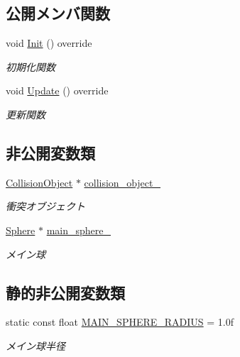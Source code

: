 \subsection*{公開メンバ関数}
\begin{DoxyCompactItemize}
\item 
void \mbox{\hyperlink{class_goal_collision_ab6089638f5390e019a55ae11952e1cf9}{Init}} () override
\begin{DoxyCompactList}\small\item\em 初期化関数 \end{DoxyCompactList}\item 
void \mbox{\hyperlink{class_goal_collision_a1e3995dc2f5ba2678580d06699ca6936}{Update}} () override
\begin{DoxyCompactList}\small\item\em 更新関数 \end{DoxyCompactList}\end{DoxyCompactItemize}
\subsection*{非公開変数類}
\begin{DoxyCompactItemize}
\item 
\mbox{\hyperlink{class_collision_object}{Collision\+Object}} $\ast$ \mbox{\hyperlink{class_goal_collision_a4375d65ce8d20f8a9074872101ff9db5}{collision\+\_\+object\+\_\+}}
\begin{DoxyCompactList}\small\item\em 衝突オブジェクト \end{DoxyCompactList}\item 
\mbox{\hyperlink{class_sphere}{Sphere}} $\ast$ \mbox{\hyperlink{class_goal_collision_a9daf60e6a5580ad41bac41177a6d2ba5}{main\+\_\+sphere\+\_\+}}
\begin{DoxyCompactList}\small\item\em メイン球 \end{DoxyCompactList}\end{DoxyCompactItemize}
\subsection*{静的非公開変数類}
\begin{DoxyCompactItemize}
\item 
static const float \mbox{\hyperlink{class_goal_collision_a8db49b4e0f1570d7181836731981e835}{M\+A\+I\+N\+\_\+\+S\+P\+H\+E\+R\+E\+\_\+\+R\+A\+D\+I\+US}} = 1.\+0f
\begin{DoxyCompactList}\small\item\em メイン球半径 \end{DoxyCompactList}\end{DoxyCompactItemize}


